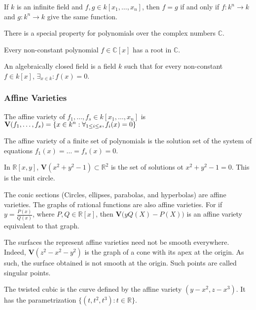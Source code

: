 \documentclass[../main.tex]{subfiles}
\begin{document}
%
\begin{theorem}
If $k$ is an infinite field and $f,g\in k[x_1,\hdots ,x_n]$, then $f=g$ if and only if $f:k^n\rightarrow k$ and $g:k^n \rightarrow k$ give the same function.
\end{theorem}
%
There is a special property for polynomials over the complex numbers $\mathbb{C}$.
%
\begin{theorem}
Every non-constant polynomial $f\in \mathbb{C}[x]$ has a root in $\mathbb{C}$.
\end{theorem}
%
\begin{definition}
An algebraically closed field is a field $k$ such that for every non-constant $f\in k[x]$, $\exists_{x\in k}: f(x)=0$.
\end{definition}
%
\subsubsection{Affine Varieties}
%
\begin{definition}
The affine variety of $f_1,\hdots, f_s \in k[x_1,\hdots ,x_n]$ is $\textbf{V}(f_1,\hdots, f_s) = \{x\in k^n:\forall_{1\leq i \leq s},f_i(x) = 0\}$
\end{definition}
%
The affine variety of a finite set of polynomials is the solution set of the system of equations $f_1(x) = \hdots = f_s(x) = 0$. 
%
\begin{example}
In $\mathbb{R}[x,y]$, $\mathbf{V}(x^2+y^2-1) \subset \mathbb{R}^2$ is the set of solutions ot $x^2+y^2-1 = 0$. This is the unit circle.
\end{example}
%
\begin{example}
The conic sections (Circles, ellipses, parabolas, and hyperbolas) are affine varieties. The graphs of rational functions are also affine varieties. For if $y = \frac{P(x)}{Q(x)}$, where $P,Q\in \mathbb{R}[x]$, then $\mathbf{V}\big(yQ(X)-P(X)\big)$ is an affine variety equivalent to that graph.
\end{example}
%
\begin{example}
The surfaces the represent affine varieties need not be smooth everywhere. Indeed, $\mathbf{V}(z^2-x^2-y^2)$ is the graph of a cone with its apex at the origin. As such, the surface obtained is not smooth at the origin. Such points are called singular points.
\end{example}
%
\begin{example}
The twisted cubic is the curve defined by the affine variety $(y-x^2,z-x^3)$. It has the parametrization $\{(t,t^2,t^3):t\in \mathbb{R}\}$.
\end{example}
\end{document}
